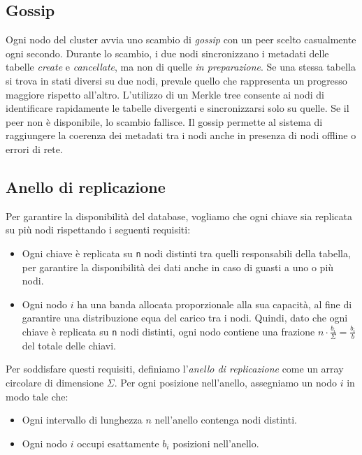 \subsection{Gossip}
\label{subsec:gossip}

Ogni nodo del cluster avvia uno scambio di \emph{gossip} con un peer scelto casualmente ogni secondo.
Durante lo scambio, i due nodi sincronizzano i metadati delle tabelle \emph{create} e \emph{cancellate}, ma non di quelle \emph{in preparazione}.
Se una stessa tabella si trova in stati diversi su due nodi, prevale quello che rappresenta un progresso maggiore rispetto all'altro.
L'utilizzo di un Merkle tree consente ai nodi di identificare rapidamente le tabelle divergenti e sincronizzarsi solo su quelle.
Se il peer non è disponibile, lo scambio fallisce.
Il gossip permette al sistema di raggiungere la coerenza dei metadati tra i nodi anche in presenza di nodi offline o errori di rete.

\subsection{Anello di replicazione}
\label{subsec:anello-replicazione}

Per garantire la disponibilità del database, vogliamo che ogni chiave sia replicata su più nodi rispettando i seguenti requisiti:

\begin{itemize}
    \item Ogni chiave è replicata su \texttt{n} nodi distinti tra quelli responsabili della tabella, per garantire la disponibilità dei dati anche in caso di guasti a uno o più nodi.
    \item Ogni nodo $i$ ha una banda allocata proporzionale alla sua capacità, al fine di garantire una distribuzione equa del carico tra i nodi. Quindi, dato che ogni chiave è replicata su \texttt{n} nodi distinti, ogni nodo contiene una frazione $\displaystyle n \cdot \frac{b_i}{\Sigma} = \frac{b_i}{b}$ del totale delle chiavi.
\end{itemize}

Per soddisfare questi requisiti, definiamo l'\emph{anello di replicazione} come un array circolare di dimensione $\Sigma$.
Per ogni posizione nell'anello, assegniamo un nodo $i$ in modo tale che:

\begin{itemize}
    \item Ogni intervallo di lunghezza $n$ nell'anello contenga nodi distinti.
    \item Ogni nodo $i$ occupi esattamente $b_i$ posizioni nell'anello.
\end{itemize}

